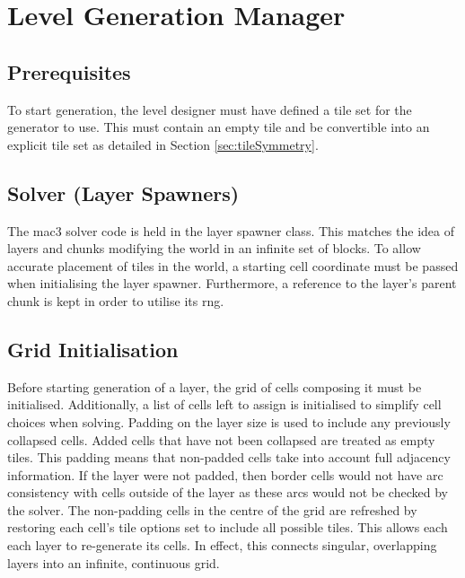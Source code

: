 \section{Level Generation Manager}
\subsection{Prerequisites}
To start generation, the level designer must have defined a tile set for the generator to use. This must contain an empty tile and be convertible into an explicit tile set as detailed in Section \ref{sec:tileSymmetry}.

\subsection{Solver (Layer Spawners)}
The \acrshort{mac3} solver code is held in the layer spawner class. This matches the idea of layers and chunks modifying the world in an infinite set of blocks. To allow accurate placement of tiles in the world, a starting cell coordinate must be passed when initialising the layer spawner. Furthermore, a reference to the layer's parent chunk is kept in order to utilise its \acrshort{rng}.

\subsection{Grid Initialisation}
Before starting generation of a layer, the grid of cells composing it must be initialised. Additionally, a list of cells left to assign is initialised to simplify cell choices when solving. Padding on the layer size is used to include any previously collapsed cells. Added cells that have not been collapsed are treated as empty tiles. This padding means that non-padded cells take into account full adjacency information. If the layer were not padded, then border cells would not have arc consistency with cells outside of the layer as these arcs would not be checked by the solver. The non-padding cells in the centre of the grid are refreshed by restoring each cell's tile options set to include all possible tiles. This allows each each layer to re-generate its cells. In effect, this connects singular, overlapping layers into an infinite, continuous grid.%


